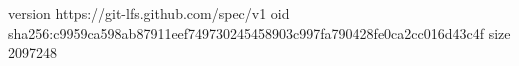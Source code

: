 version https://git-lfs.github.com/spec/v1
oid sha256:c9959ca598ab87911eef749730245458903c997fa790428fe0ca2cc016d43c4f
size 2097248
